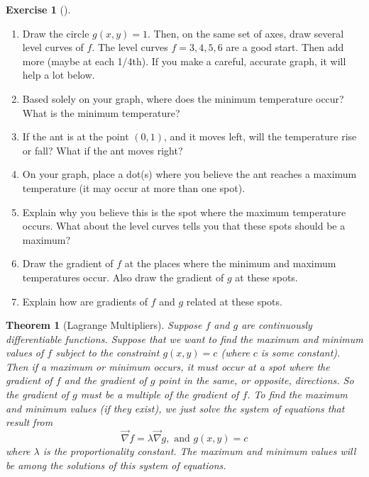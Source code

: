\documentclass[10pt,]{book}
\theoremstyle{plain}
\newtheorem{theorem}{Theorem}[section]
\theoremstyle{definition}
\theoremstyle{definition}
\theoremstyle{definition}
\theoremstyle{definition}
\newtheorem{exploration}[project]{Exercise}
\theoremstyle{definition}
\numberwithin{equation}{section}
\begin{document}
\begin{exploration}[]\label{exploration-240}
\leavevmode%
\begin{enumerate}[font=\bfseries,label=(\alph*),ref=\alph*]
\item\label{task-650} Draw the circle \(g(x,y)=1\).  Then, on the same set of axes, draw several level curves of \(f\). The level curves \(f=3, 4, 5, 6\) are a good start. Then add more (maybe at each 1/4th). If you make a careful, accurate graph, it will help a lot below.%
\item\label{task-651} Based solely on your graph, where does the minimum temperature occur?  What is the minimum temperature?%
\item\label{task-652} If the ant is at the point \((0,1)\), and it moves left, will the temperature rise or fall?  What if the ant moves right?%
\item\label{task-653} On your graph, place a dot(s) where you believe the ant reaches a maximum temperature (it may occur at more than one spot).%
\item\label{task-654} Explain why you believe this is the spot where the maximum temperature occurs. What about the level curves tells you that these spots should be a maximum?%
\item\label{task-655} Draw the gradient of \(f\) at the places where the minimum and maximum temperatures occur. Also draw the gradient of \(g\) at these spots.%
\item\label{task-656} Explain how are gradients of \(f\) and \(g\) related at these spots.%
\end{enumerate}
\end{exploration}
\begin{theorem}[{Lagrange Multipliers}]\label{theorem-9}
Suppose \(f\) and \(g\) are continuously differentiable functions. Suppose that we want to find the maximum and minimum values of \(f\) subject to the constraint \(g(x,y)=c\) (where \(c\) is some constant). Then if a maximum or minimum occurs, it must occur at a spot where the gradient of \(f\) and the gradient of \(g\) point in the same, or opposite, directions. So the gradient of \(g\) must be a multiple of the gradient of \(f\). To find the maximum and minimum values (if they exist), we just solve the system of equations that result from%
\begin{equation*}
\vec \nabla f = \lambda \vec \nabla g, \text{ and }  g(x,y)=c
\end{equation*}
where \(\lambda\) is the proportionality constant. The maximum and minimum values will be among the solutions of this system of equations.%
\end{theorem}
\end{document}
